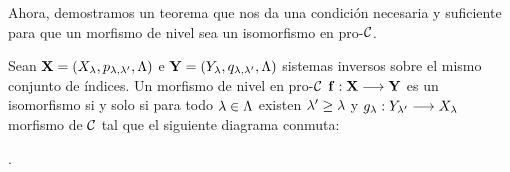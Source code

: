 Ahora, demostramos un teorema que nos da una condición necesaria y suficiente para que un morfismo de nivel sea un isomorfismo en pro-$ \mathcal{C}  $.
\begin{theorem}\label{moritalemma}
  Sean $ \mathbf{X} = (X_\lambda,p_{\lambda,\lambda'},\Lambda) $ e $ \mathbf{Y } = (Y_\lambda,q_{\lambda,\lambda'},\Lambda ) $ sistemas inversos sobre el mismo conjunto de índices. Un morfismo de nivel en pro-$ \mathcal{C}  $ $ \mathbf{f }:\mathbf{X}\longrightarrow \mathbf{Y } $ es un isomorfismo si y solo si para todo $ \lambda\in \Lambda  $ existen $ \lambda'\geq \lambda  $ y $ g_\lambda:Y_{\lambda'}\longrightarrow X_{\lambda}  $ morfismo de $ \mathcal{C}  $ tal que el siguiente diagrama conmuta:
  \begin{center}
    .
  \end{center} 
\end{theorem}
